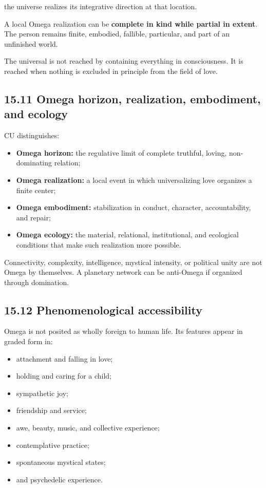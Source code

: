\documentclass[
  11pt,
]{article}
\providecommand{\tightlist}{%
  \setlength{\itemsep}{0pt}\setlength{\parskip}{0pt}}
\begin{document}
the universe realizes its integrative direction at that location.

A local Omega realization can be \textbf{complete in kind while partial
in extent}. The person remains finite, embodied, fallible, particular,
and part of an unfinished world.

The universal is not reached by containing everything in consciousness.
It is reached when nothing is excluded in principle from the field of
love.

\subsection{15.11 Omega horizon, realization, embodiment, and
ecology}\label{omega-horizon-realization-embodiment-and-ecology}

CU distinguishes:

\begin{itemize}
\tightlist
\item
  \textbf{Omega horizon:} the regulative limit of complete truthful,
  loving, non-dominating relation;
\item
  \textbf{Omega realization:} a local event in which universalizing love
  organizes a finite center;
\item
  \textbf{Omega embodiment:} stabilization in conduct, character,
  accountability, and repair;
\item
  \textbf{Omega ecology:} the material, relational, institutional, and
  ecological conditions that make such realization more possible.
\end{itemize}

Connectivity, complexity, intelligence, mystical intensity, or political
unity are not Omega by themselves. A planetary network can be anti-Omega
if organized through domination.

\subsection{15.12 Phenomenological
accessibility}\label{phenomenological-accessibility}

Omega is not posited as wholly foreign to human life. Its features
appear in graded form in:

\begin{itemize}
\tightlist
\item
  attachment and falling in love;
\item
  holding and caring for a child;
\item
  sympathetic joy;
\item
  friendship and service;
\item
  awe, beauty, music, and collective experience;
\item
  contemplative practice;
\item
  spontaneous mystical states;
\item
  and psychedelic experience.
\end{itemize}
\end{document}
